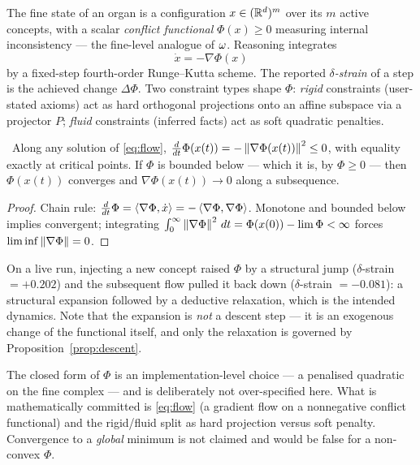 \begin{construction}\label{con:flow}
The fine state of an organ is a configuration $x\in(\mathbb{R}^{d})^m$ over its $m$
active concepts, with a scalar \emph{conflict functional} $\Phi(x)\ge0$
measuring internal inconsistency --- the fine-level analogue of
$\omega$. Reasoning integrates
\begin{equation}\label{eq:flow}
  \dot x=-\nabla\Phi(x)
\end{equation}
by a fixed-step fourth-order Runge--Kutta scheme. The reported
\emph{$\delta$-strain} of a step is the achieved change $\Delta\Phi$.
Two constraint types shape $\Phi$: \emph{rigid} constraints
(user-stated axioms) act as hard orthogonal projections onto an affine
subspace via a projector $P$; \emph{fluid} constraints (inferred facts)
act as soft quadratic penalties.
\end{construction}

\begin{proposition}\label{prop:descent}
\Proved\ Along any solution of \eqref{eq:flow},
$\frac{d}{dt}\Phi(x(t))=-\left\lVert \nabla\Phi(x(t)) \right\rVert^2\le0$, with equality
exactly at critical points. If $\Phi$ is bounded below --- which it is,
by $\Phi\ge0$ --- then $\Phi(x(t))$ converges and
$\nabla\Phi(x(t))\to0$ along a subsequence.
\end{proposition}
\begin{proof}
Chain rule: $\frac{d}{dt}\Phi=\left\langle \nabla\Phi,\dot x\right\rangle
=-\left\langle \nabla\Phi,\nabla\Phi\right\rangle$. Monotone and bounded below implies
convergent; integrating
$\int_0^\infty\left\lVert \nabla\Phi \right\rVert^2\,dt=\Phi(x(0))-\lim\Phi<\infty$
forces $\liminf\left\lVert \nabla\Phi \right\rVert=0$.
\end{proof}

\begin{remark}
On a live run, injecting a new concept raised $\Phi$ by a structural
jump ($\delta$-strain $=+0.202$) and the subsequent flow pulled it back
down ($\delta$-strain $=-0.081$): a structural expansion followed by a
deductive relaxation, which is the intended dynamics. Note that the
expansion is \emph{not} a descent step --- it is an exogenous change of
the functional itself, and only the relaxation is governed by
Proposition~\ref{prop:descent}.
\end{remark}

\begin{hon}\Hon
The closed form of $\Phi$ is an implementation-level choice --- a
penalised quadratic on the fine complex --- and is deliberately not
over-specified here. What is mathematically committed is \eqref{eq:flow}
(a gradient flow on a nonnegative conflict functional) and the
rigid/fluid split as hard projection versus soft penalty. Convergence to
a \emph{global} minimum is not claimed and would be false for a
non-convex $\Phi$.
\end{hon}

